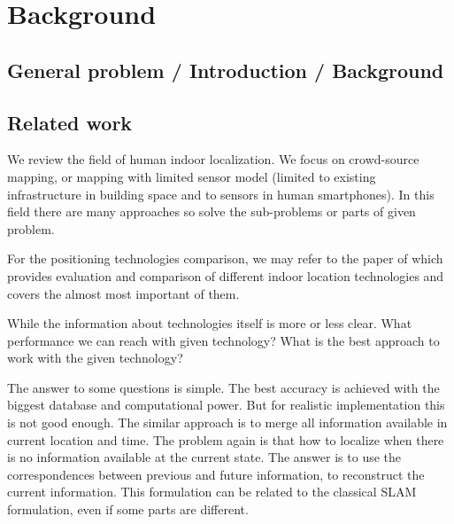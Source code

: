 \chapter{Background}
\label{cap:background}




\section{General problem / Introduction / Background
}


\section{Related work}

We review the field of human indoor localization. We focus on crowd-source mapping, or mapping with limited sensor model (limited to existing infrastructure in building space and to sensors in human smartphones).
In this field there are many approaches so solve the sub-problems or parts of given problem. 



For the positioning technologies comparison, we may refer to the paper of \cite{Lymberopoulos} which provides evaluation and comparison of different indoor location technologies and covers the almost most important of them.

While the information about technologies itself is more or less clear. What performance we can reach with given technology? What is the best approach to work with the given technology?

The answer to some questions is simple. The best accuracy is achieved with the biggest database and computational power. But for realistic implementation this is not good enough. The similar approach is to merge all information available in current location and time. The problem again is that how to localize when there is no information available at the current state. The answer is to use the correspondences between previous and future information, to reconstruct the current information. This formulation can be related to the classical SLAM formulation, even if some parts are different.

